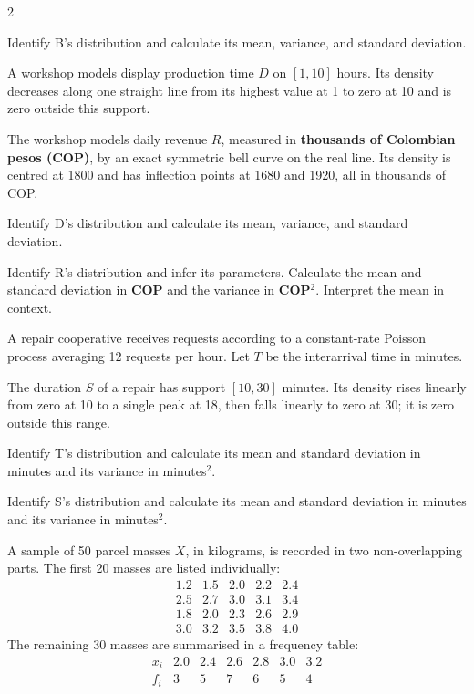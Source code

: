 \begin{multicols}{2}
\begin{minipage}{\linewidth}
Identify B's distribution and calculate its mean, variance, and standard deviation. 

\end{minipage}\par
\begin{minipage}{\linewidth}
A workshop models display production time $D$ on $[1,10]$ hours. Its density decreases along one straight line from its highest value at 1 to zero at 10 and is zero outside this support.

The workshop models daily revenue $R$, measured in \textbf{thousands of Colombian pesos (COP)}, by an exact symmetric bell curve on the real line. Its density is centred at 1800 and has inflection points at 1680 and 1920, all in thousands of COP.

Identify D's distribution and calculate its mean, variance, and standard deviation. 

Identify R's distribution and infer its parameters. Calculate the mean and standard deviation in \textbf{COP} and the variance in \textbf{COP$^2$}. Interpret the mean in context. 

\end{minipage}\par
\begin{minipage}{\linewidth}
A repair cooperative receives requests according to a constant-rate Poisson process averaging 12 requests per hour. Let $T$ be the interarrival time in minutes.

The duration $S$ of a repair has support $[10,30]$ minutes. Its density rises linearly from zero at 10 to a single peak at 18, then falls linearly to zero at 30; it is zero outside this range.

Identify T's distribution and calculate its mean and standard deviation in minutes and its variance in minutes$^2$. 

Identify S's distribution and calculate its mean and standard deviation in minutes and its variance in minutes$^2$. 

\end{minipage}\par


A sample of 50 parcel masses $X$, in kilograms, is recorded in two non-overlapping parts. The first 20 masses are listed individually:
\[
\begin{array}{rrrrr}
1.2&1.5&2.0&2.2&2.4\\
2.5&2.7&3.0&3.1&3.4\\
1.8&2.0&2.3&2.6&2.9\\
3.0&3.2&3.5&3.8&4.0
\end{array}
\]
The remaining 30 masses are summarised in a frequency table:
\[
\begin{array}{c|rrrrrr}
x_i&2.0&2.4&2.6&2.8&3.0&3.2\\\hline
f_i&3&5&7&6&5&4
\end{array}
\]


\end{multicols}
